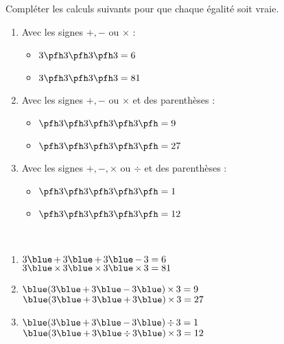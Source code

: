 \begin{colonne*exercice}
\bigskip


\begin{exercice}%
   Compléter les calculs suivants pour que chaque égalité soit vraie.
   \begin{enumerate}
      \item Avec les signes $+, -$ ou $\times$ : \medskip
      \begin{itemize}
         \item $3 \pfh 3 \pfh 3 \pfh 3 = 6$ \medskip
         \item $3 \pfh 3 \pfh 3 \pfh 3 = 81$ \medskip
      \end{itemize}
      \item Avec les signes $+, -$ ou $\times$ et des parenthèses : \medskip
      \begin{itemize}
         \item $\pfh 3 \pfh 3 \pfh 3 \pfh 3 \pfh = 9$ \medskip
         \item $\pfh 3 \pfh 3 \pfh 3 \pfh 3 \pfh = 27$ \medskip
      \end{itemize}
      \item Avec les signes $+, -,\times$ ou $\div$ et des parenthèses :\medskip
      \begin{itemize}
         \item $\pfh 3 \pfh 3 \pfh 3 \pfh 3 \pfh = 1$ \medskip
         \item $\pfh 3 \pfh 3 \pfh 3 \pfh 3 \pfh = 12$
      \end{itemize}
   \end{enumerate}
\end{exercice}

\begin{corrige}
   \ \\ [-5mm]
   \begin{enumerate}
      \item $3 {\blue \,+\,} 3 {\blue \,+\,} 3 {\blue \,-\,} 3 = 6$ \\
         $3 {\blue \,\times\,} 3  {\blue \,\times\,} 3  {\blue \,\times\,} 3 = 81$ \smallskip
      \item ${\blue (} 3 {\blue \,+\,} 3 {\blue \,-\,} 3 {\blue )\,\times\,} 3 = 9$ \\
         ${\blue (} 3 {\blue \,+\,} 3 {\blue \,+\,} 3 {\blue )\,\times\,} 3 = 27$ \smallskip
      \item ${\blue (} 3 {\blue \,+\,} 3 {\blue \,-\,} 3 {\blue )\,\div\,} 3 = 1$ \\
         ${\blue (} 3 {\blue \,+\,} 3 {\blue \,\div\,} 3 {\blue )\,\times\,} 3 = 12$
   \end{enumerate}


\end{corrige}
\end{colonne*exercice}
